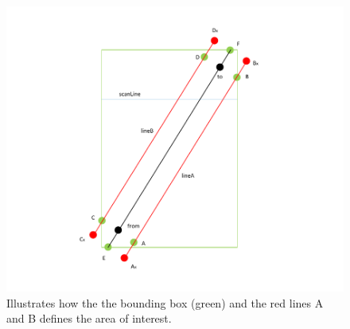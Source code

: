 \begin{figure}[htb]
	\centering
	\includegraphics[width=0.8\paperwidth,trim=0 0 0
	0]{graphics/cupCollect.pdf}
	\caption{Illustrates how the the bounding box (green) and the red lines A and B defines the area of interest.}
	\label{fig:cupCollect}			
\end{figure}

